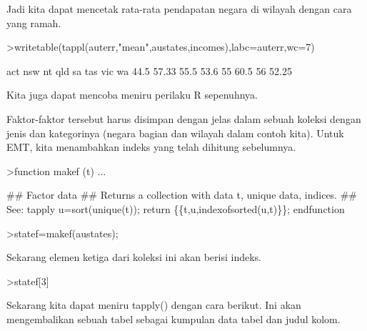 \documentclass[a4paper,10pt]{article}
\begin{document}
\begin{eulernotebook}
\begin{eulercomment}
\begin{eulercomment}
\begin{eulercomment}
\begin{eulercomment}
\begin{eulercomment}
\begin{eulercomment}
\begin{eulercomment}
\begin{eulercomment}
\begin{eulercomment}
\begin{eulercomment}
\begin{eulercomment}
\begin{eulercomment}
\begin{eulercomment}
\begin{eulercomment}
\begin{eulercomment}
\begin{eulercomment}
\begin{eulercomment}
\begin{eulercomment}
\begin{eulercomment}
\begin{eulercomment}
\begin{eulercomment}
\begin{eulercomment}
\begin{eulercomment}
Jadi kita dapat mencetak rata-rata pendapatan negara di wilayah dengan
cara yang ramah.
\end{eulercomment}
\begin{eulerprompt}
>writetable(tappl(auterr,"mean",austates,incomes),labc=auterr,wc=7)
\end{eulerprompt}
\begin{euleroutput}
      act    nsw     nt    qld     sa    tas    vic     wa
     44.5  57.33   55.5   53.6     55   60.5     56  52.25
\end{euleroutput}
\begin{eulercomment}
Kita juga dapat mencoba meniru perilaku R sepenuhnya.

Faktor-faktor tersebut harus disimpan dengan jelas dalam sebuah
koleksi dengan jenis dan kategorinya (negara bagian dan wilayah dalam
contoh kita). Untuk EMT, kita menambahkan indeks yang telah dihitung
sebelumnya.
\end{eulercomment}
\begin{eulerprompt}
>function makef (t) ...
\end{eulerprompt}
\begin{eulerudf}
  ## Factor data
  ## Returns a collection with data t, unique data, indices.
  ## See: tapply
  u=sort(unique(t));
  return \{\{t,u,indexofsorted(u,t)\}\};
  endfunction
\end{eulerudf}
\begin{eulerprompt}
>statef=makef(austates);
\end{eulerprompt}
\begin{eulercomment}
Sekarang elemen ketiga dari koleksi ini akan berisi indeks.
\end{eulercomment}
\begin{eulerprompt}
>statef[3]
\end{eulerprompt}
\begin{euleroutput}
  [6,  5,  4,  2,  2,  3,  8,  8,  4,  7,  2,  7,  4,  4,  5,  6,  5,  3,
  8,  7,  4,  2,  2,  8,  5,  1,  2,  7,  7,  1]
\end{euleroutput}
\begin{eulercomment}
Sekarang kita dapat meniru tapply() dengan cara berikut. Ini akan
mengembalikan sebuah tabel sebagai kumpulan data tabel dan judul
kolom.
\end{eulercomment}
\begin{eulerprompt}

\end{eulerprompt}
\end{eulercomment}
\end{eulercomment}
\end{eulercomment}
\end{eulercomment}
\end{eulercomment}
\end{eulercomment}
\end{eulercomment}
\end{eulercomment}
\end{eulercomment}
\end{eulercomment}
\end{eulercomment}
\end{eulercomment}
\end{eulercomment}
\end{eulercomment}
\end{eulercomment}
\end{eulercomment}
\end{eulercomment}
\end{eulercomment}
\end{eulercomment}
\end{eulercomment}
\end{eulercomment}
\end{eulercomment}
\end{eulernotebook}
\end{document}
